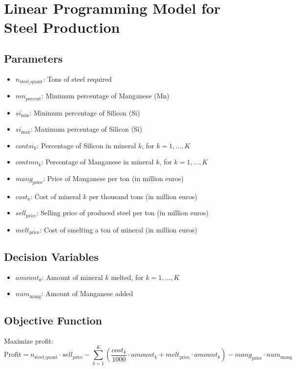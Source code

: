 \documentclass{article}
\begin{document}
\section*{Linear Programming Model for Steel Production}

\subsection*{Parameters}
\begin{itemize}
    \item $n_{\text{steel\_quant}}$: Tons of steel required
    \item $mn_{\text{percent}}$: Minimum percentage of Manganese (Mn)
    \item $si_{\text{min}}$: Minimum percentage of Silicon (Si)
    \item $si_{\text{max}}$: Maximum percentage of Silicon (Si)
    \item $contsi_k$: Percentage of Silicon in mineral $k$, for $k = 1, \ldots, K$
    \item $contmn_k$: Percentage of Manganese in mineral $k$, for $k = 1, \ldots, K$
    \item $mang_{\text{price}}$: Price of Manganese per ton (in million euros)
    \item $cost_k$: Cost of mineral $k$ per thousand tons (in million euros)
    \item $sell_{\text{price}}$: Selling price of produced steel per ton (in million euros)
    \item $melt_{\text{price}}$: Cost of smelting a ton of mineral (in million euros)
\end{itemize}

\subsection*{Decision Variables}
\begin{itemize}
    \item $amount_k$: Amount of mineral $k$ melted, for $k = 1, \ldots, K$
    \item $num_{\text{mang}}$: Amount of Manganese added
\end{itemize}

\subsection*{Objective Function}
Maximize profit:
\[
\text{Profit} = n_{\text{steel\_quant}} \cdot sell_{\text{price}} - \sum_{k=1}^{K} \left( \frac{cost_k}{1000} \cdot amount_k + melt_{\text{price}} \cdot amount_k \right) - mang_{\text{price}} \cdot num_{\text{mang}}
\]
\end{document}
